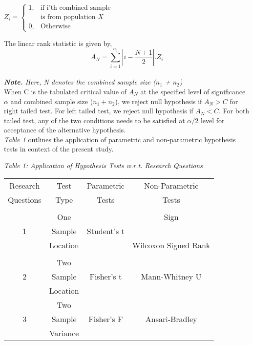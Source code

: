 \documentclass[12pt,a4paper]{report}
\begin{document}
\begin{center}
\begin{math}
Z_i = \left\{
\begin{array}{ll}
1, & \mbox{if i'th combined sample }\\
   & \mbox{is from population $X$}\\
0, & \mbox{Otherwise}
\end{array}\right.
\end{math}\\[20pt]
\end{center}
\Large{The linear rank statistic is given by,}\\[0.5pt]
\begin{equation}
A_N = \sum_{i=1}^{n_1} |i - \frac{N+1}{2}|.Z_i
\end{equation}\\
\large{\textit{{\textbf{Note.}} Here, N denotes the combined sample size ($n_1$ + $n_2$)}}\\[10pt]
\Large{When C is the tabulated critical value of $A_N$ at the specified level of significance $\alpha$ and combined sample size ($n_1 + n_2$), we reject null hypothesis if $A_N > C$ for right tailed test. For left tailed test, we reject null hypothesis if $A_N < C$. For both tailed test, any of the two conditions needs to be satisfied at $\alpha/2$ level for acceptance of the alternative hypothesis. }\\[20pt]
\Large{\textit{Table 1} outlines the application of parametric and non-parametric hypothesis tests in context of the present study.}\\[10pt]
\begin{center}
\Large{\textit{Table 1: Application of Hypothesis Tests w.r.t. Research Questions}}
\begin{table}[hbt!]
\Centering
\Large
\begin{tabular}{c|c|c|c}
\hline
Research & Test & Parametric & Non-Parametric\\
Questions & Type & Tests & Tests\\
\hline
 &&&\\
  & One & & Sign\\
1  & Sample & Student's t &  \\
  & Location &   & Wilcoxon Signed Rank\\
  &&&\\
\hline
  & Two & & \\
2  & Sample & Fisher's t &  Mann-Whitney U\\
  & Location &   & \\
\hline
  & Two & & \\
3  & Sample & Fisher's F & Ansari-Bradley \\
  & Variance &   & \\
\hline
\end{tabular}
\end{table}
\end{center}
\end{document}
